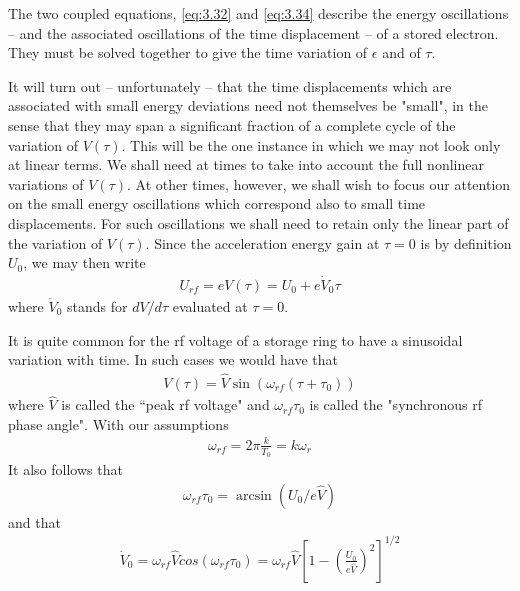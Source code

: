 The two coupled equations, \eqref{eq:3.32} and \eqref{eq:3.34} describe the energy oscillations -- and the associated oscillations of the time displacement -- of a stored electron. They must be solved together to give the time variation of $\epsilon$ and of $\tau$.

It will turn out -- unfortunately -- that the time displacements which are associated with small energy deviations need not themselves be "small", in the sense that they may span a significant fraction of a complete cycle of the variation of $V(\tau)$. This will be the one instance in which we may not look only at linear terms. We shall need at times to take into account the full nonlinear variations of $V(\tau)$. At other times, however, we shall wish to focus our attention on the small energy oscillations which correspond also to small time displacements. For such oscillations we shall need to retain only the linear part of the variation of $V(\tau)$. Since the acceleration energy gain at $\tau = 0$ is by definition $U_0$, we may then write
\begin{align}
	U_{rf} = eV(\tau) = U_0 + e\dot{V}_0\tau\label{eq:3.35}
\end{align}
where $\dot{V}_0$ stands for $dV/d\tau$ evaluated at $\tau=0$.

It is quite common for the rf voltage of a storage ring to have a sinusoidal variation with time. In such cases we would have that
\begin{align}\label{eq:3.36}
	V(\tau) = \widehat{V} \sin(\omega_{rf}(\tau+\tau_0))
\end{align}
where $\widehat{V}$ is called the “peak rf voltage" and $\omega_{rf}\tau_0$  is called the "synchronous rf phase angle". With our assumptions
\begin{align}
	\omega_{rf} = 2\pi \frac{k}{T_0} = k\omega_r
\end{align}
It also follows that
\begin{align}
	\omega_{rf}\tau_0 = \arcsin(U_0/e\widehat{V})
\end{align}
and that
\begin{align}
	\dot{V}_0 = \omega_{rf}\widehat{V}cos(\omega_{rf}\tau_0) = \omega_{rf}\widehat{V}\left[1-\left(\frac{U_0}{e\widehat{V}}\right)^2\right]^{1/2}
\end{align}